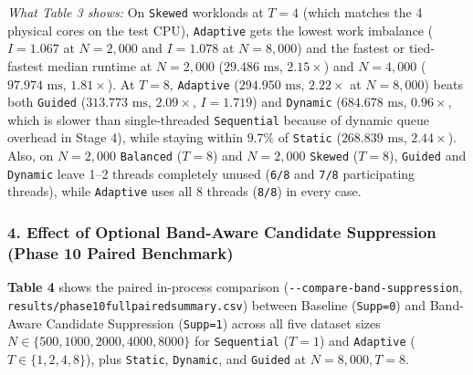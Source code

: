\documentclass[11pt,a4paper]{article}
\renewcommand{\_}{\textunderscore\allowbreak}
\begin{document}
\textit{What Table 3 shows:} On \texttt{Skewed} workloads at $T=4$ (which matches the 4 physical cores on the test CPU), \texttt{Adaptive} gets the lowest work imbalance ($I = 1.067$ at $N=2,000$ and $I = 1.078$ at $N=8,000$) and the fastest or tied-fastest median runtime at $N=2,000$ ($29.486\text{ ms}$, $2.15\times$) and $N=4,000$ ($97.974\text{ ms}$, $1.81\times$). At $T=8$, \texttt{Adaptive} ($294.950\text{ ms}$, $2.22\times$ at $N=8,000$) beats both \texttt{Guided} ($313.773\text{ ms}$, $2.09\times$, $I=1.719$) and \texttt{Dynamic} ($684.678\text{ ms}$, $0.96\times$, which is slower than single-threaded \texttt{Sequential} because of dynamic queue overhead in Stage 4), while staying within $9.7\%$ of \texttt{Static} ($268.839\text{ ms}$, $2.44\times$). Also, on $N=2,000$ \texttt{Balanced} ($T=8$) and $N=2,000$ \texttt{Skewed} ($T=8$), \texttt{Guided} and \texttt{Dynamic} leave 1--2 threads completely unused (\texttt{6/8} and \texttt{7/8} participating threads), while \texttt{Adaptive} uses all 8 threads (\texttt{8/8}) in every case.

\subsubsection*{4. Effect of Optional Band-Aware Candidate Suppression (Phase 10 Paired Benchmark)}
\textbf{Table 4} shows the paired in-process comparison (\texttt{-{}-compare-band-suppression}, \texttt{results/phase10\_full\_paired\_summary.csv}) between Baseline (\texttt{Supp=0}) and Band-Aware Candidate Suppression (\texttt{Supp=1}) across all five dataset sizes $N \in \{500, 1000, 2000, 4000, 8000\}$ for \texttt{Sequential} ($T=1$) and \texttt{Adaptive} ($T \in \{1, 2, 4, 8\}$), plus \texttt{Static}, \texttt{Dynamic}, and \texttt{Guided} at $N=8,000, T=8$.
\end{document}
